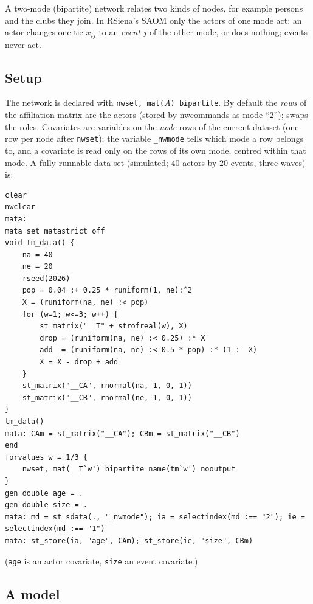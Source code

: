 A two-mode (bipartite) network relates two kinds of nodes, for example persons and the clubs they join. In RSiena's SAOM only the actors of one mode act: an actor changes one tie $x_{ij}$ to an \emph{event} $j$ of the other mode, or does nothing; events never act.

\subsection{Setup}

The network is declared with \texttt{nwset, mat(}$A$\texttt{) bipartite}. By default the \emph{rows} of the affiliation matrix are the actors (stored by nwcommands as mode ``2'');  swaps the roles. Covariates are variables on the \emph{node} rows of the current dataset (one row per node after \texttt{nwset}); the variable \texttt{\_nwmode} tells which mode a row belongs to, and a covariate is read only on the rows of its own mode, centred within that mode. A fully runnable data set (simulated; $40$ actors by $20$ events, three waves) is:

\begin{lstlisting}
clear
nwclear
mata:
mata set matastrict off
void tm_data() {
    na = 40
    ne = 20
    rseed(2026)
    pop = 0.04 :+ 0.25 * runiform(1, ne):^2
    X = (runiform(na, ne) :< pop)
    for (w=1; w<=3; w++) {
        st_matrix("__T" + strofreal(w), X)
        drop = (runiform(na, ne) :< 0.25) :* X
        add  = (runiform(na, ne) :< 0.5 * pop) :* (1 :- X)
        X = X - drop + add
    }
    st_matrix("__CA", rnormal(na, 1, 0, 1))
    st_matrix("__CB", rnormal(ne, 1, 0, 1))
}
tm_data()
mata: CAm = st_matrix("__CA"); CBm = st_matrix("__CB")
end
forvalues w = 1/3 {
    nwset, mat(__T`w') bipartite name(tm`w') nooutput
}
gen double age = .
gen double size = .
mata: md = st_sdata(., "_nwmode"); ia = selectindex(md :== "2"); ie = selectindex(md :== "1")
mata: st_store(ia, "age", CAm); st_store(ie, "size", CBm)
\end{lstlisting}
(\texttt{age} is an actor covariate, \texttt{size} an event covariate.)

\subsection{A model}

